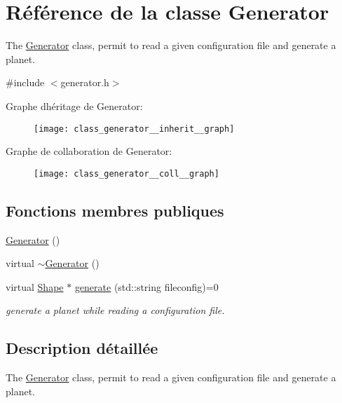 \hypertarget{class_generator}{}\section{Référence de la classe Generator}
\label{class_generator}


The \hyperlink{class_generator}{Generator} class, permit to read a given configuration file and generate a planet.  




{\ttfamily \#include $<$generator.\+h$>$}



Graphe d\textquotesingle{}héritage de Generator\+:
\nopagebreak
\begin{figure}[H]
\begin{center}
\leavevmode
\texttt{[image: class\_generator\_\_inherit\_\_graph]}
\end{center}
\end{figure}


Graphe de collaboration de Generator\+:
\nopagebreak
\begin{figure}[H]
\begin{center}
\leavevmode
\texttt{[image: class\_generator\_\_coll\_\_graph]}
\end{center}
\end{figure}
\subsection*{Fonctions membres publiques}
\begin{DoxyCompactItemize}
\item 
\hyperlink{class_generator_aaaf1e5f3a47ede3ef8a96a301ee04a10}{Generator} ()
\item 
virtual \hyperlink{class_generator_aeb355d65ed59bc5738a5b3e9637186e1}{$\sim$\+Generator} ()
\item 
virtual \hyperlink{class_shape}{Shape} $\ast$ \hyperlink{class_generator_a91197ce0544ad549cf3646957c33c0e9}{generate} (std\+::string fileconfig)=0
\begin{DoxyCompactList}\small\item\em generate a planet while reading a configuration file. \end{DoxyCompactList}\end{DoxyCompactItemize}


\subsection{Description détaillée}
The \hyperlink{class_generator}{Generator} class, permit to read a given configuration file and generate a planet. 

